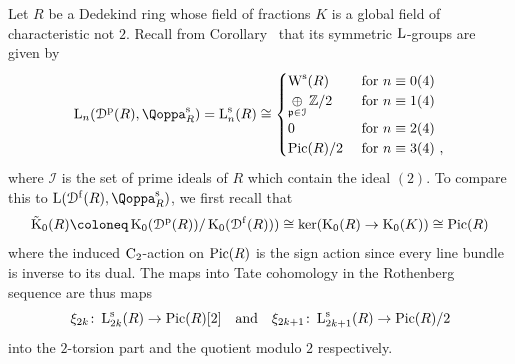 \begin{example}
\label{example:free-dedekind}%
Let $R$ be a Dedekind ring whose field of fractions $K$ is a global field of characteristic not $2$. Recall from Corollary~ that its symmetric $\operatorname L$-groups are given by
\[
\L_n(\Dperf(R),\QF^\s_R) = \L_n^\s(R) \cong 
\begin{cases}
\W^\s(R) & \text{ for } n \equiv 0 (4) \\
\displaystyle\mathop{\oplus}\limits_{\fp \in \mathcal{I}} \ZZ/2 & \text{ for } n \equiv 1 (4) \\
0 & \text{ for } n \equiv 2 (4) \\
\Pic(R)/2 & \text{ for } n \equiv 3 (4) \ ,
\end{cases}
\]
where $\mathcal{I}$ is the set of prime ideals of $R$ which contain the ideal $(2)$.
To compare this to $\L(\Dfree(R),\QF^\s_R)$, we first recall that 
\[
\tilde \K_0(R) \coloneq \K_0(\Dperf(R))/\K_0(\Dfree(R))) \cong \ker(\K_0(R) \to \K_0(K)) \cong \Pic(R)
\]
where
the induced $\mathrm{C_2}$-action on $\operatorname{Pic}(R)$ is the sign action since every line bundle is inverse to its dual. The maps into Tate cohomology in the Rothenberg sequence are thus maps
\[
\xi_{2k}\colon \operatorname L^{\mathrm{s}}_{2k}(R) \to \operatorname{Pic}(R)[2] \quad\text{and}\quad \xi_{2k+1}\colon \operatorname L^{\mathrm{s}}_{2k+1}(R) \to \operatorname{Pic}(R)/2
\]
into the $2$-torsion part and the quotient modulo $2$ respectively. 


\end{example}
